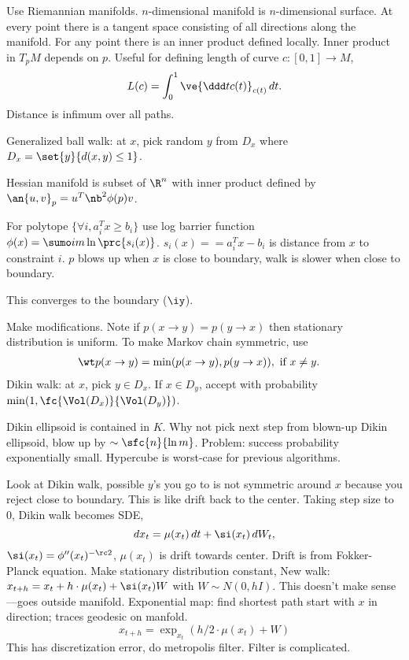 Use Riemannian manifolds. $n$-dimensional manifold is $n$-dimensional surface. At every point there is a tangent space consisting of all directions along the manifold. For any point there is an inner product defined locally. Inner product in $T_pM$ depends on $p$.
Useful for defining length of curve $c:[0,1]\to M$,
$$
L(c) = \int_0^1 \ve{\ddd tc(t)}_{c(t)}\,dt.
$$
Distance is infimum over all paths.

Generalized ball walk: at $x$, pick random $y$ from $D_x$ where $D_x=\set{y}{d(x,y)\le 1}$. 

Hessian manifold is subset of $\R^n$ with inner product defined by $\an{u,v}_p = u^T \nb^2\phi(p)v$. 

For polytope $\{\forall i, a_i^Tx\ge b_i\}$ use log barrier function $\phi(x)=\sumo im \ln \prc{s_i(x)}$. $s_i(x)==a_i^Tx-b_i$ is distance from $x$ to constraint $i$. $p$ blows up when $x$ is close to boundary, walk is slower when close to boundary. 

This converges to the boundary ($\iy$). 

Make modifications. Note if $p(x\to y)=p(y\to x)$ then stationary distribution is uniform. To make Markov chain symmetric, use
\begin{align}
\wt p(x\to y) &=
\min(p(x\to y),p(y\to x)),\text{ if } x\ne y.
\end{align}
Dikin walk: at $x$, pick $y\in D_x$. If $x\in D_y$, accept with probability $\min(1,\fc{\Vol(D_x)}{\Vol(D_y)})$. 

Dikin ellipsoid is contained in $K$. Why not pick next step from blown-up Dikin ellipsoid, blow up by $\sim \sfc{n}{\ln m}$. Problem: success probability exponentially small. Hypercube is worst-case for previous algorithms.

Look at Dikin walk, possible $y$'s you go to is not symmetric around $x$ because you reject close to boundary. This is like drift back to the center. 
Taking step size to 0, Dikin walk becomes SDE, 
$$
dx_t = \mu(x_t) \,dt + \si(x_t)\,dW_t,
$$
$\si(x_t)=\phi''(x_t)^{-\rc 2}$, $\mu(x_t)$ is drift towards center.
Drift is from Fokker-Planck equation. Make stationary distribution constant, 
New walk: $x_{t+h} = x_t + h\cdot \mu(x_t) + \si(x_t)W$ with $W\sim N(0,hI)$. This doesn't make sense---goes outside manifold.
Exponential map: find shortest path start with $x$ in direction; traces geodesic on manfold. 
$$
x_{t+h} = \exp_{x_t}(h/2\cdot \mu(x_t)+W)
$$
This has discretization error, do metropolis filter. Filter is complicated.

